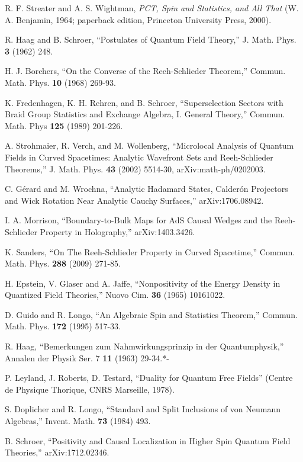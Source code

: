 \documentclass[12pt]{article}
\numberwithin{equation}{section}
\begin{document}
\begin{thebibliography}{99}
R. F. Streater and A. S. Wightman, {\it PCT, Spin and Statistics, and All That} (W. A. Benjamin, 1964; paperback edition,
Princeton University Press, 2000).

R. Haag and B. Schroer, ``Postulates of Quantum Field Theory,'' J. Math. Phys. {\bf 3} (1962) 248.




H. J. Borchers,
``On the Converse of the Reeh-Schlieder Theorem,''
Commun. Math. Phys. {\bf 10} (1968) 269-93.

K. Fredenhagen, K. H. Rehren, and B. Schroer, ``Superselection Sectors with Braid Group Statistics and Exchange Algebra, I. General
Theory,'' Commun. Math. Phys {\bf 125} (1989) 201-226.

A. Strohmaier, R. Verch, and M. Wollenberg, ``Microlocal Analysis of Quantum Fields in Curved Spacetimes:
Analytic Wavefront Sets and Reeh-Schlieder Theorems,'' J. Math. Phys. {\bf 43} (2002) 5514-30, arXiv:math-ph/0202003.

C. G\'{e}rard and M. Wrochna, ``Analytic Hadamard States, Calder\'{o}n Projectors and Wick Rotation Near Analytic
Cauchy Surfaces,''  arXiv:1706.08942.

I. A. Morrison, ``Boundary-to-Bulk Maps for AdS Causal Wedges and the Reeh-Schlieder
Property in Holography,'' arXiv:1403.3426.

K. Sanders, ``On The Reeh-Schlieder Property in Curved Spacetime,'' Commun. Math. Phys. {\bf 288} (2009) 271-85.

  H. Epstein, V. Glaser and A. Jaffe, ``Nonpositivity of the Energy Density in Quantized Field
Theories,'' Nuovo Cim. {\bf 36} (1965) 10161022.

 D. Guido and R. Longo, ``An Algebraic Spin and Statistics Theorem,'' Commun. Math. Phys. {\bf 172} (1995) 517-33.

 R. Haag, ``Bemerkungen zum Nahmwirkungsprinzip in der Quantumphysik,'' Annalen der Physik Ser. 7 {\bf 11} (1963) 29-34.*-

 P. Leyland, J. Roberts, D. Testard, ``Duality for Quantum Free Fields'' (Centre de Physique
Thorique, CNRS Marseille, 1978).

S. Doplicher and R. Longo, ``Standard and Split Inclusions of von Neumann Algebras,'' Invent. Math. {\bf 73} (1984) 493.


 B. Schroer, ``Positivity and Causal Localization in Higher Spin Quantum Field Theories,'' 
arXiv:1712.02346.


\end{thebibliography}
\end{document}
